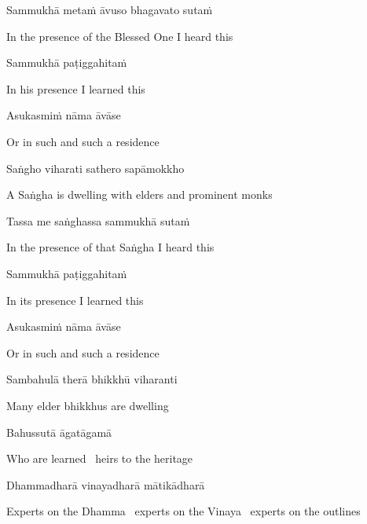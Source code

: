 Sammukhā metaṁ āvuso bhagavato sutaṁ

\begin{english}
  In the presence of the Blessed One I heard this
\end{english}

Sammukhā paṭiggahitaṁ

\begin{english}
  In his presence I learned this
\end{english}

Asukasmiṁ nāma āvāse

\begin{english}
  Or in such and such a residence
\end{english}

Saṅgho viharati sathero sapāmokkho

\begin{english}
  A Saṅgha is dwelling with elders and prominent monks
\end{english}

Tassa me saṅghassa sammukhā sutaṁ

\begin{english}
  In the presence of that Saṅgha I heard this
\end{english}

Sammukhā paṭiggahitaṁ

\begin{english}
  In its presence I learned this
\end{english}

Asukasmiṁ nāma āvāse

\begin{english}
  Or in such and such a residence
\end{english}

Sambahulā therā bhikkhū viharanti

\begin{english}
  Many elder bhikkhus are dwelling
\end{english}

Bahussutā āgatāgamā

\begin{english}
  Who are learned \breathmark\ heirs to the heritage
\end{english}

Dhammadharā vinayadharā mātikādharā

\begin{english-hang}
  Experts on the Dhamma \breathmark\ experts on the Vinaya \breathmark\ experts on the outlines
\end{english-hang}

